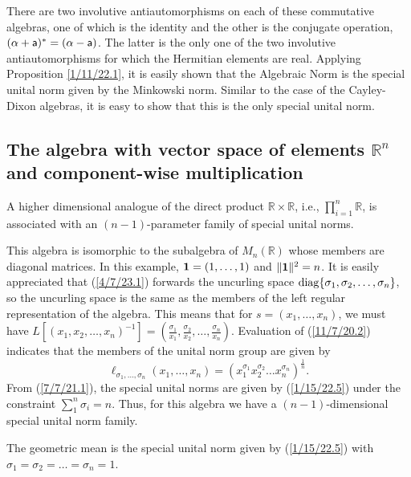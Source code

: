 \documentclass{amsart}
\numberwithin{equation}{section}
\theoremstyle{definition}
\numberwithin{theorem}{section}
\begin{document}
 There are two involutive antiautomorphisms on each of these commutative algebras, one of which is the identity and the other is the conjugate operation, $(\alpha+ {\sf a})^* = (\alpha- {\sf a})$. The latter is the only one of the two involutive antiautomorphisms  for which the Hermitian elements are real.  Applying Proposition \ref{1/11/22.1}, it is easily shown that the Algebraic Norm is the special unital norm given by the Minkowski norm.  Similar to the case of the Cayley-Dixon algebras, it is easy to show that this is the only special unital norm.

 
 \subsection{The algebra with vector space of elements $\mathbb{R}^n$ and component-wise multiplication} A higher dimensional analogue of the direct product $\mathbb{R}\times \mathbb{R}$, i.e., $\prod_{i=1}^n \mathbb{R}$, is associated with an $(n-1)$-parameter family of  special unital norms.

 This algebra is isomorphic to the subalgebra of $ M_n(\mathbb{R})$  whose members are diagonal matrices. In this example, ${\bf 1} = (1,\dots,1)$ and $\|{\bf 1}\|^2 = n$.   It is easily appreciated that (\ref{4/7/23.1}) forwards the uncurling space ${\rm diag} \{ \sigma_1, \sigma_2,\dots,\sigma_n\}$, so the uncurling space is the same as the members of the left regular representation of the algebra.  This means that for $s=(x_1,\dots,x_n)$, we must have $L[(x_1,x_2,\dots,x_n)^{-1}] = (\frac{\sigma_1}{x_1}, \frac{\sigma_2}{x_2},\dots,\frac{\sigma_n}{x_n})$.     Evaluation of (\ref{11/7/20.2}) indicates that the members of the unital norm group are given by  \begin{equation}\label{1/15/22.5} \ell_{\sigma_1,\dots,\sigma_n}(x_1,\dots,x_n) = (x_1^{\sigma_1} x_2^{\sigma_2} \dots x_n^{\sigma_n})^\frac{1}{n}. \end{equation} From (\ref{7/7/21.1}), the special unital norms are given by (\ref{1/15/22.5}) under the constraint $\sum_1^n \sigma_i = n$. Thus, for this algebra we have a $(n-1)$-dimensional special unital norm family.   
 
 The geometric mean is the special unital norm given by (\ref{1/15/22.5}) with $\sigma_1=\sigma_2=\dots =\sigma_n = 1$.  
   
\end{document}
